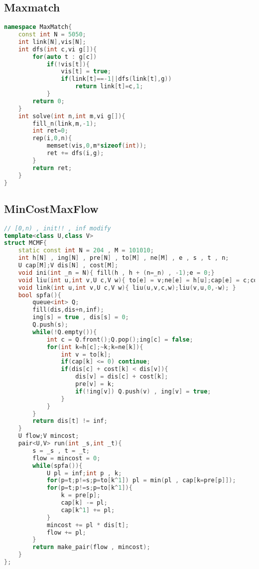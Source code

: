 \subsection{Maxmatch}
\begin{lstlisting}[language=C++]
namespace MaxMatch{
    const int N = 5050;
    int link[N],vis[N];
    int dfs(int c,vi g[]){
        for(auto t : g[c])
            if(!vis[t]){
                vis[t] = true;
                if(link[t]==-1||dfs(link[t],g))
                    return link[t]=c,1;
            }
        return 0;
    }
    int solve(int n,int m,vi g[]){
        fill_n(link,m,-1);
        int ret=0;
        rep(i,0,n){
            memset(vis,0,m*sizeof(int));
            ret += dfs(i,g);
        }
        return ret;
    }
}
\end{lstlisting}
\subsection{MinCostMaxFlow}
\begin{lstlisting}[language=C++]
// [0,n) , init!! , inf modify
template<class U,class V>
struct MCMF{
    static const int N = 204 , M = 101010;
    int h[N] , ing[N] , pre[N] , to[M] , ne[M] , e , s , t , n;
    U cap[M];V dis[N] , cost[M];
    void ini(int _n = N){ fill(h , h + (n=_n) , -1);e = 0;}
    void liu(int u,int v,U c,V w){ to[e] = v;ne[e] = h[u];cap[e] = c;cost[e] = w;h[u] = e++;}
    void link(int u,int v,U c,V w){ liu(u,v,c,w);liu(v,u,0,-w); }
    bool spfa(){
        queue<int> Q;
        fill(dis,dis+n,inf);
        ing[s] = true , dis[s] = 0;
        Q.push(s);
        while(!Q.empty()){
            int c = Q.front();Q.pop();ing[c] = false;
            for(int k=h[c];~k;k=ne[k]){
                int v = to[k];
                if(cap[k] <= 0) continue;
                if(dis[c] + cost[k] < dis[v]){
                    dis[v] = dis[c] + cost[k];
                    pre[v] = k;
                    if(!ing[v]) Q.push(v) , ing[v] = true;
                }
            }
        }
        return dis[t] != inf;
    }
    U flow;V mincost;
    pair<U,V> run(int _s,int _t){
        s = _s , t = _t;
        flow = mincost = 0;
        while(spfa()){
            U pl = inf;int p , k;
            for(p=t;p!=s;p=to[k^1]) pl = min(pl , cap[k=pre[p]]);
            for(p=t;p!=s;p=to[k^1]){
                k = pre[p];
                cap[k] -= pl;
                cap[k^1] += pl;
            }
            mincost += pl * dis[t];
            flow += pl;
        }
        return make_pair(flow , mincost);
    }
};
\end{lstlisting}
